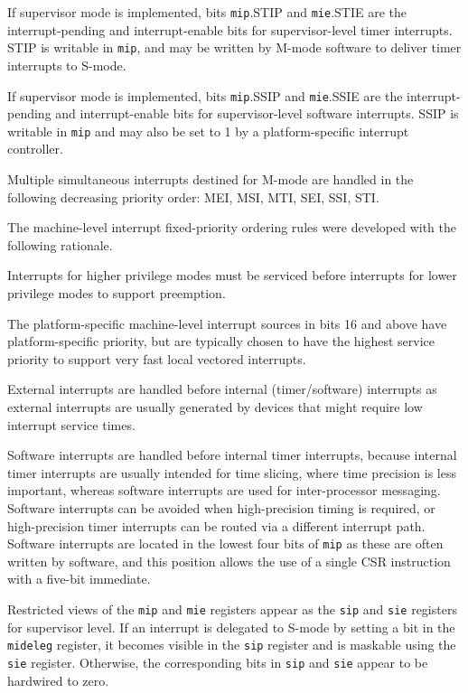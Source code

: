 If supervisor mode is implemented, bits {\tt mip}.STIP and {\tt mie}.STIE
are the interrupt-pending and interrupt-enable bits for supervisor-level
timer interrupts.
STIP is writable in {\tt mip}, and may be
written by M-mode software to deliver timer interrupts to S-mode.

If supervisor mode is implemented, bits {\tt mip}.SSIP and {\tt mie}.SSIE
are the interrupt-pending and interrupt-enable bits for supervisor-level
software interrupts.
SSIP is writable in {\tt mip} and may also be set to 1 by a platform-specific
interrupt controller.

Multiple simultaneous
interrupts destined for M-mode are handled in the following
decreasing priority order: MEI, MSI, MTI, SEI, SSI, STI.

\begin{commentary}
  The machine-level interrupt fixed-priority ordering rules were developed
  with the following rationale.

  Interrupts for higher privilege modes must be serviced before
  interrupts for lower privilege modes to support preemption.

  The platform-specific machine-level interrupt sources in bits 16 and above
  have platform-specific priority, but are typically chosen to have the
  highest service priority to support very fast local vectored interrupts.

  External interrupts are handled before internal (timer/software)
  interrupts as external interrupts are usually generated by devices
  that might require low interrupt service times.

  Software interrupts are handled before internal timer interrupts,
  because internal timer interrupts are usually intended for time
  slicing, where time precision is less important, whereas software
  interrupts are used for inter-processor messaging.  Software
  interrupts can be avoided when high-precision timing is required, or
  high-precision timer interrupts can be routed via a different
  interrupt path.
  Software interrupts are located in the lowest four bits of {\tt mip}
  as these are often written by software, and this position allows the
  use of a single CSR instruction with a five-bit immediate.
\end{commentary}

Restricted views of the {\tt mip} and {\tt mie} registers appear as
the {\tt sip} and {\tt sie} registers for supervisor level.
If an interrupt is delegated to
S-mode by setting a bit in the {\tt mideleg} register,
it becomes visible in the {\tt sip} register and is maskable
using the {\tt sie} register.  Otherwise, the corresponding
bits in {\tt sip} and {\tt sie} appear to be hardwired
to zero.

